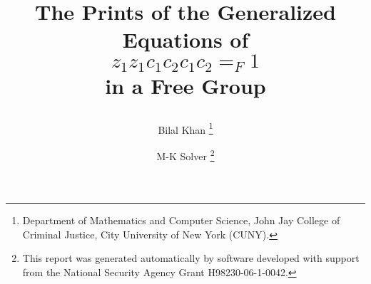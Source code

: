 \documentclass[final]{article}
\begin{document}
\date{}
\title{
  {\Large The Prints of the Generalized Equations of \\$z_{1}z_{1}c_{1}c_{2}c_{1}c_{2}=_F 1$\\ in a Free Group}
  {\normalsize
   \author{Bilal Khan
        \thanks{Department of Mathematics and Computer Science, John Jay College of Criminal Justice, City University of New York (CUNY).}
   \and M-K Solver
        \thanks{This report was generated automatically by software developed with support from the National Security Agency Grant H98230-06-1-0042.}
           }
  }
}

\maketitle


\setcounter{page}{27} 
\end{document}
